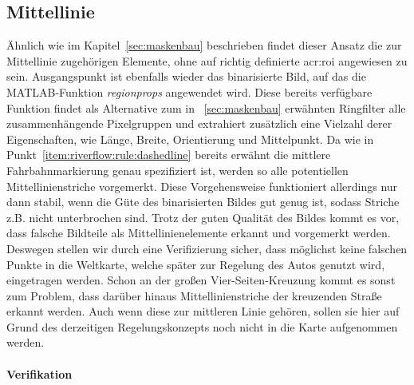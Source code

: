 \subsection{Mittellinie}
\label{ssec:fahrspurerkennung:riverflow:mittellinie}
Ähnlich wie im Kapitel~\ref{sec:maskenbau} beschrieben findet dieser Ansatz die zur Mittellinie zugehörigen Elemente, ohne auf richtig definierte \gls{acr:roi} angewiesen zu sein. Ausgangspunkt ist ebenfalls wieder das binarisierte Bild, auf das die MATLAB-Funktion \emph{regionprops} angewendet wird. Diese bereits verfügbare Funktion findet als Alternative zum in ~\ref{sec:maskenbau} erwähnten \glqq Ringfilter\grqq{} alle zusammenhängende Pixelgruppen und extrahiert zusätzlich eine Vielzahl derer Eigenschaften, wie Länge, Breite, Orientierung und Mittelpunkt. Da wie in Punkt~\ref{item:riverflow:rule:dashedline} bereits erwähnt die mittlere Fahrbahnmarkierung genau spezifiziert ist, werden so alle potentiellen Mittellinienstriche vorgemerkt. Diese Vorgehensweise funktioniert allerdings nur dann stabil, wenn die Güte des binarisierten Bildes gut genug ist, sodass Striche z.B. nicht unterbrochen sind. Trotz der guten Qualität des Bildes kommt es vor, dass falsche Bildteile als Mittellinienelemente erkannt und vorgemerkt werden. Deswegen stellen wir durch eine Verifizierung sicher, dass möglichst keine falschen Punkte in die Weltkarte, welche später zur Regelung des Autos genutzt wird, eingetragen werden. Schon an der großen Vier-Seiten-Kreuzung kommt es sonst zum Problem, dass darüber hinaus Mittellinienstriche der kreuzenden Straße erkannt werden. Auch wenn diese zur mittleren Linie gehören, sollen sie hier auf Grund des derzeitigen Regelungskonzepts noch nicht in die Karte aufgenommen werden. 

\paragraph{Verifikation}

